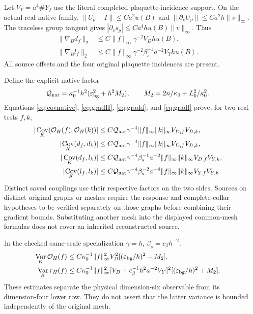 \documentclass[11pt,letterpaper]{article}
\numberwithin{equation}{section}
\theoremstyle{plain}
\theoremstyle{remark}
\DeclareMathOperator{\Var}{Var}
\DeclareMathOperator{\Cov}{Cov}
\newcommand{\OH}{\mathcal O_H}
\begin{document}
Let $V_Y=a^4\#Y_f$ use the literal completed plaquette-incidence support.
On the actual real native family,
$\|U_p-I\|\le Ca^2u(B)$ and
$\|\partial_vU_p\|\le Ca^2h\|v\|_\infty$.
The traceless group tangent gives
$|\partial_vs_p|\le Ca^4h u(B)\|v\|_\infty$.
Thus
\begin{align}
 \|\nabla_Bd_f\|_2&\le C\|f\|_\infty\gamma^{-2}V_Dh u(B),\label{eq:gradd}\\
 \|\nabla_Bl_f\|_2&\le C\|f\|_\infty\gamma^{-2}\beta_s^{-1}a^{-2}V_Yh u(B).
 \label{eq:gradl}
\end{align}
All source offsets and the four original plaquette incidences are present.

Define the explicit native factor
\begin{equation}
 \mathcal Q_{\rm nat}=\kappa_0^{-1}h^2
                (\varepsilon_{\rm bg}^2+h^2M_2),
 \qquad M_2=2n/\kappa_0+L_0^2/\kappa_0^2.
 \label{eq:Qnat}
\end{equation}
Equations \eqref{eq:covnative}, \eqref{eq:gradH}, \eqref{eq:gradd}, and
\eqref{eq:gradl} prove, for two real tests $f,k$,
\begin{align}
 |\Cov_K(\OH(f),\OH(k))|
 &\le C\mathcal Q_{\rm nat}\gamma^{-4}
                \|f\|_\infty\|k\|_\infty V_{D,f}V_{D,k},\label{eq:Hcov}\\
 |\Cov_K(d_f,d_k)|
 &\le C\mathcal Q_{\rm nat}\gamma^{-4}
                \|f\|_\infty\|k\|_\infty V_{D,f}V_{D,k},\label{eq:ddcov}\\
 |\Cov_K(d_f,l_k)|
 &\le C\mathcal Q_{\rm nat}\gamma^{-4}\beta_s^{-1}a^{-2}
                \|f\|_\infty\|k\|_\infty V_{D,f}V_{Y,k},\label{eq:dlcov}\\
 |\Cov_K(l_f,l_k)|
 &\le C\mathcal Q_{\rm nat}\gamma^{-4}\beta_s^{-2}a^{-4}
                \|f\|_\infty\|k\|_\infty V_{Y,f}V_{Y,k}.\label{eq:llcov}
\end{align}
Distinct saved couplings use their respective factors on the two sides.
Sources on distinct original graphs or meshes require the response and
complete-collar hypotheses to be verified separately on those graphs before
combining their gradient bounds. Substituting another mesh into the displayed
common-mesh formulas does not cover an inherited reconstructed source.

In the checked same-scale specialization $\gamma=h$, $\beta_s=c_\beta h^{-2}$,
\begin{align}
 \Var_K\OH(f)&\le C\kappa_0^{-1}\|f\|_\infty^2V_D^2
                      [ (\varepsilon_{\rm bg}/h)^2+M_2],\label{eq:samescaleH}\\
 \Var_Kr_H(f)&\le C\kappa_0^{-1}\|f\|_\infty^2
       [V_D+c_\beta^{-1}h^2a^{-2}V_Y]^2
                      [(\varepsilon_{\rm bg}/h)^2+M_2].\label{eq:samescaler}
\end{align}
These estimates separate the physical dimension-six observable from its
dimension-four lower row. They do not assert that the latter variance is
bounded independently of the original mesh.
\end{document}
